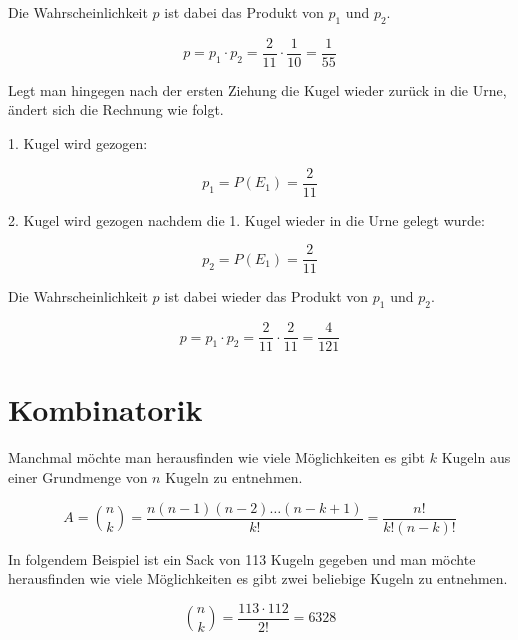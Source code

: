 Die Wahrscheinlichkeit $p$ ist dabei das Produkt von $p_1$ und $p_2$.

\begin{displaymath}
p=p_1 \cdot p_2=\frac{2}{11} \cdot \frac{1}{10} = \frac{1}{55}
\end{displaymath}

Legt man hingegen nach der ersten Ziehung die Kugel wieder zurück in die Urne, ändert sich die Rechnung wie folgt.

1. Kugel wird gezogen:

\begin{displaymath}
p_1=P(E_1)=\frac{2}{11}
\end{displaymath}

2. Kugel wird gezogen nachdem die 1. Kugel wieder in die Urne gelegt wurde:

\begin{displaymath}
p_2=P(E_1)=\frac{2}{11}
\end{displaymath}

Die Wahrscheinlichkeit $p$ ist dabei wieder das Produkt von $p_1$ und $p_2$.

\begin{displaymath}
p=p_1 \cdot p_2=\frac{2}{11} \cdot \frac{2}{11} = \frac{4}{121}
\end{displaymath}

\section{Kombinatorik}

Manchmal möchte man herausfinden wie viele Möglichkeiten es gibt $k$ Kugeln aus einer Grundmenge von $n$ Kugeln zu entnehmen.

\begin{displaymath}
A={ n \choose k}=\frac{n(n-1)(n-2)\ldots (n-k+1)}{k!}=\frac{n!}{k!(n-k)!} 
\end{displaymath}

In folgendem Beispiel ist ein Sack von 113 Kugeln gegeben und man möchte herausfinden wie viele Möglichkeiten es gibt zwei beliebige Kugeln zu entnehmen.

\begin{displaymath}
{ n \choose k}=\frac{113\cdot 112}{2!}=6328
\end{displaymath}